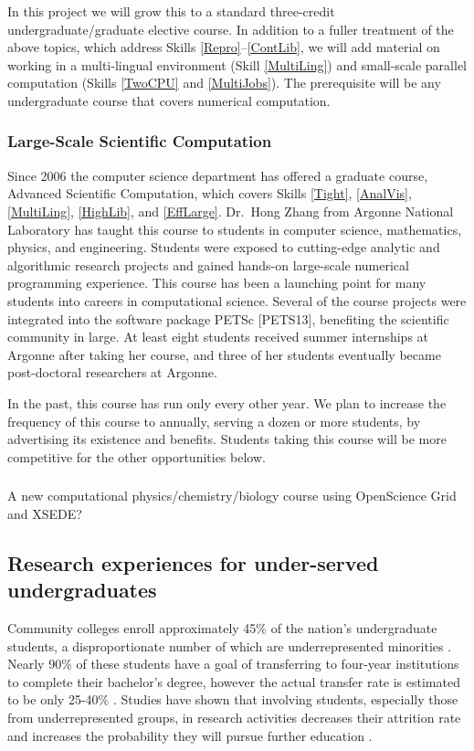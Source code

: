 \documentclass[11pt]{NSFamsart}
\begin{document}
In this project we will grow this to a standard three-credit undergraduate/graduate elective course.  In addition to a fuller treatment of the above topics, which address Skills \ref{Repro}--\ref{ContLib}, we will add material on working in a multi-lingual environment (Skill \ref{MultiLing}) and small-scale parallel computation (Skills \ref{TwoCPU} and \ref{MultiJobs}).  The prerequisite will be any undergraduate course that covers numerical computation.

\subsubsection{Large-Scale Scientific Computation} \label{LargeSC} Since 2006 the computer science department has offered a graduate course, Advanced Scientific Computation, which covers Skills \ref{Tight}, \ref{AnalVis}, \ref{MultiLing}, \ref{HighLib}, and \ref{EffLarge}.  Dr.\ Hong Zhang from Argonne National Laboratory has taught this course to students in computer science, mathematics, physics, and engineering. Students were exposed to cutting-edge analytic and algorithmic research projects and gained hands-on large-scale numerical programming experience. This course has been a launching point for many students into careers in computational science.  Several of the course projects were integrated into the software package PETSc [PETS13], benefiting the scientific community in large. At least eight students received summer internships at Argonne after taking her course, and three of her students eventually became post-doctoral researchers at Argonne.  

In the past, this course has run only every other year.  We plan to increase the frequency of this course to annually, serving a dozen or more students, by advertising its existence and benefits.  Students taking this course will be more competitive for the other opportunities below.

\subsubsection{} A new computational physics/chemistry/biology course using OpenScience Grid and XSEDE? 

\subsection{Research experiences for under-served undergraduates} 
Community colleges enroll approximately 45\% of the nation's undergraduate students, a disproportionate number of which are underrepresented minorities \cite{KnappKG12,nsfreport13}.  Nearly 90\% of these students have a goal of transferring to four-year institutions to complete their bachelor's degree, however the actual transfer rate is estimated to be only 25-40\% \cite{HoachlanderSH03,MelguizoKA11}.  Studies have shown that involving students, especially those from underrepresented groups, in  research activities decreases  their attrition rate and increases the probability they will pursue further education \cite{BarlowV04,JonesBV10}.
\end{document}
